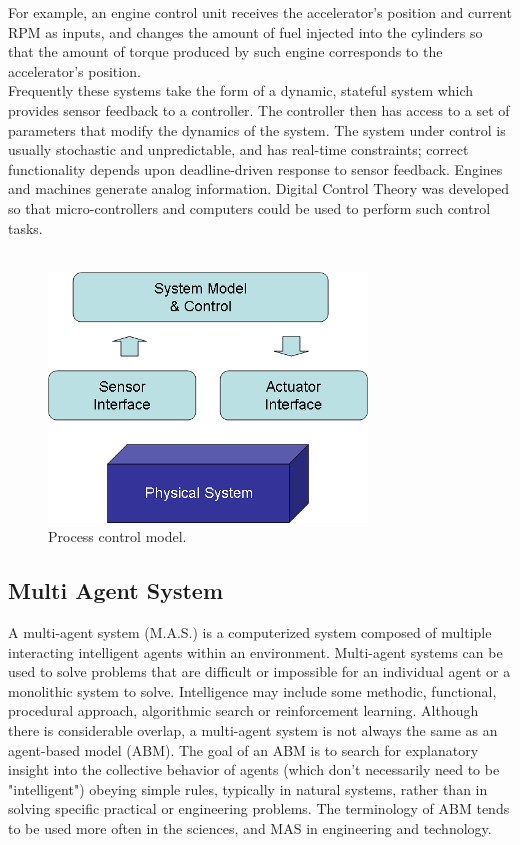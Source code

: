 \documentclass{article}
\begin{document}
\noindent For example, an engine control unit receives the accelerator's position and current RPM as inputs, and changes the amount of fuel injected into the cylinders so that the amount of torque produced by such engine corresponds to the accelerator's position.\\

\noindent Frequently these systems take the form of a dynamic, stateful system which provides sensor feedback to a controller. The controller then has access to a set of parameters that modify the dynamics of the system. The system under control is usually stochastic and unpredictable, and has real-time constraints; correct functionality depends upon deadline-driven response to sensor feedback. Engines and machines generate analog information. Digital Control Theory was developed so that micro-controllers and computers could be used to perform such control tasks.\\\\


\begin{figure}[h]
\centering
\includegraphics[scale=0.8]{pc.png}
\caption{Process control model.}
\label{fig_pc}
\end{figure}
	



\subsection{Multi Agent System}
A multi-agent system (M.A.S.) is a computerized system composed of multiple interacting intelligent agents within an environment. Multi-agent systems can be used to solve problems that are difficult or impossible for an individual agent or a monolithic system to solve. Intelligence may include some methodic, functional, procedural approach, algorithmic search or reinforcement learning. Although there is considerable overlap, a multi-agent system is not always the same as an agent-based model (ABM). The goal of an ABM is to search for explanatory insight into the collective behavior of agents (which don't necessarily need to be "intelligent") obeying simple rules, typically in natural systems, rather than in solving specific practical or engineering problems. The terminology of ABM tends to be used more often in the sciences, and MAS in engineering and technology.\\\\
\end{document}
